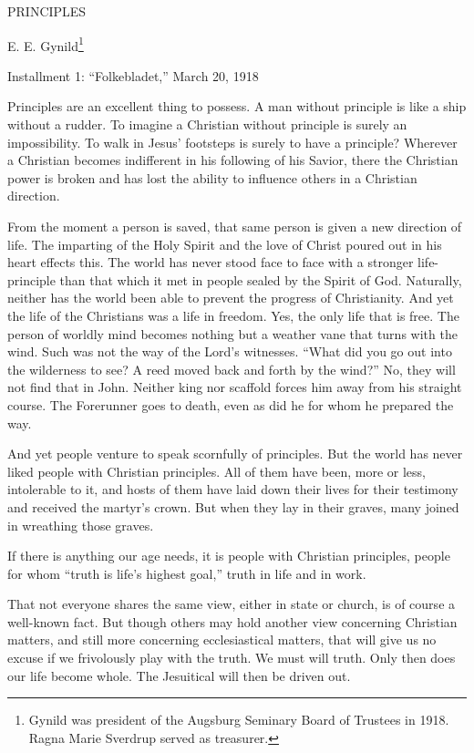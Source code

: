 
PRINCIPLES

E. E. Gynild\footnote{Gynild was president of the Augsburg Seminary Board of Trustees in 1918. Ragna Marie Sverdrup served as treasurer.}


Installment 1: “Folkebladet,” March 20, 1918

Principles are an excellent thing to possess. A man without principle is like a ship without a rudder. To imagine a Christian without principle is surely an impossibility. To walk in Jesus’ footsteps is surely to have a principle? Wherever a Christian becomes indifferent in his following of his Savior, there the Christian power is broken and has lost the ability to influence others in a Christian direction.

From the moment a person is saved, that same person is given a new direction of life. The imparting of the Holy Spirit and the love of Christ poured out in his heart effects this. The world has never stood face to face with a stronger life-principle than that which it met in people sealed by the Spirit of God. Naturally, neither has the world been able to prevent the progress of Christianity. And yet the life of the Christians was a life in freedom. Yes, the only life that is free. The person of worldly mind becomes nothing but a weather vane that turns with the wind. Such was not the way of the Lord’s witnesses. “What did you go out into the wilderness to see? A reed moved back and forth by the wind?” No, they will not find that in John. Neither king nor scaffold forces him away from his straight course. The Forerunner goes to death, even as did he for whom he prepared the way.

And yet people venture to speak scornfully of principles. But the world has never liked people with Christian principles. All of them have been, more or less, intolerable to it, and hosts of them have laid down their lives for their testimony and received the martyr’s crown. But when they lay in their graves, many joined in wreathing those graves.

If there is anything our age needs, it is people with Christian principles, people for whom “truth is life’s highest goal,” truth in life and in work.

That not everyone shares the same view, either in state or church, is of course a well-known fact. But though others may hold another view concerning Christian matters, and still more concerning ecclesiastical matters, that will give us no excuse if we frivolously play with the truth. We must will truth. Only then does our life become whole. The Jesuitical will then be driven out.

